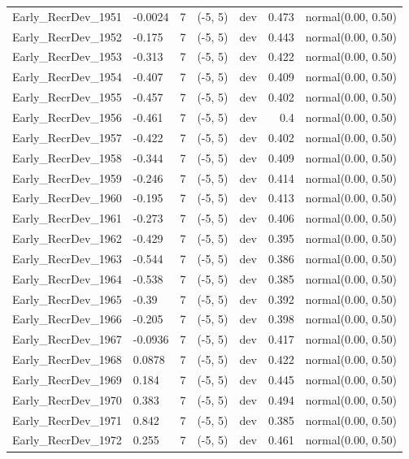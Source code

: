 \documentclass[
]{scrartcl}
\begin{document}
\begin{landscape}
\begin{longtable}{llrllrl}
Early\_RecrDev\_1951 & -0.0024 & 7 & (-5, 5) & dev & 0.473 & normal(0.00, 0.50) \\ 
Early\_RecrDev\_1952 & -0.175 & 7 & (-5, 5) & dev & 0.443 & normal(0.00, 0.50) \\ 
Early\_RecrDev\_1953 & -0.313 & 7 & (-5, 5) & dev & 0.422 & normal(0.00, 0.50) \\ 
Early\_RecrDev\_1954 & -0.407 & 7 & (-5, 5) & dev & 0.409 & normal(0.00, 0.50) \\ 
Early\_RecrDev\_1955 & -0.457 & 7 & (-5, 5) & dev & 0.402 & normal(0.00, 0.50) \\ 
Early\_RecrDev\_1956 & -0.461 & 7 & (-5, 5) & dev & 0.4 & normal(0.00, 0.50) \\ 
Early\_RecrDev\_1957 & -0.422 & 7 & (-5, 5) & dev & 0.402 & normal(0.00, 0.50) \\ 
Early\_RecrDev\_1958 & -0.344 & 7 & (-5, 5) & dev & 0.409 & normal(0.00, 0.50) \\ 
Early\_RecrDev\_1959 & -0.246 & 7 & (-5, 5) & dev & 0.414 & normal(0.00, 0.50) \\ 
Early\_RecrDev\_1960 & -0.195 & 7 & (-5, 5) & dev & 0.413 & normal(0.00, 0.50) \\ 
Early\_RecrDev\_1961 & -0.273 & 7 & (-5, 5) & dev & 0.406 & normal(0.00, 0.50) \\ 
Early\_RecrDev\_1962 & -0.429 & 7 & (-5, 5) & dev & 0.395 & normal(0.00, 0.50) \\ 
Early\_RecrDev\_1963 & -0.544 & 7 & (-5, 5) & dev & 0.386 & normal(0.00, 0.50) \\ 
Early\_RecrDev\_1964 & -0.538 & 7 & (-5, 5) & dev & 0.385 & normal(0.00, 0.50) \\ 
Early\_RecrDev\_1965 & -0.39 & 7 & (-5, 5) & dev & 0.392 & normal(0.00, 0.50) \\ 
Early\_RecrDev\_1966 & -0.205 & 7 & (-5, 5) & dev & 0.398 & normal(0.00, 0.50) \\ 
Early\_RecrDev\_1967 & -0.0936 & 7 & (-5, 5) & dev & 0.417 & normal(0.00, 0.50) \\ 
Early\_RecrDev\_1968 & 0.0878 & 7 & (-5, 5) & dev & 0.422 & normal(0.00, 0.50) \\ 
Early\_RecrDev\_1969 & 0.184 & 7 & (-5, 5) & dev & 0.445 & normal(0.00, 0.50) \\ 
Early\_RecrDev\_1970 & 0.383 & 7 & (-5, 5) & dev & 0.494 & normal(0.00, 0.50) \\ 
Early\_RecrDev\_1971 & 0.842 & 7 & (-5, 5) & dev & 0.385 & normal(0.00, 0.50) \\ 
Early\_RecrDev\_1972 & 0.255 & 7 & (-5, 5) & dev & 0.461 & normal(0.00, 0.50) \\ 

\end{longtable}
\end{landscape}
\end{document}
